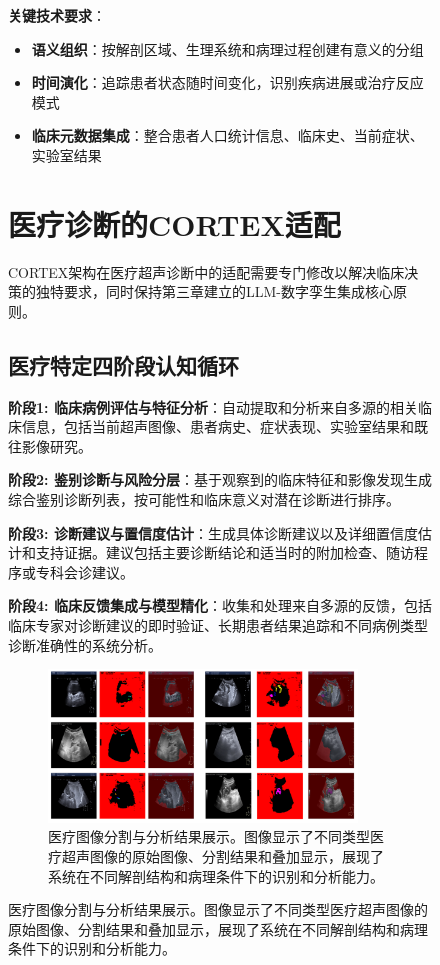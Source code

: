 \begin{figure}[htbp]
\textbf{关键技术要求}：
\begin{itemize}
\item \textbf{语义组织}：按解剖区域、生理系统和病理过程创建有意义的分组
\item \textbf{时间演化}：追踪患者状态随时间变化，识别疾病进展或治疗反应模式
\item \textbf{临床元数据集成}：整合患者人口统计信息、临床史、当前症状、实验室结果
\end{itemize}

\section{医疗诊断的CORTEX适配}

CORTEX架构在医疗超声诊断中的适配需要专门修改以解决临床决策的独特要求，同时保持第三章建立的LLM-数字孪生集成核心原则。

\subsection{医疗特定四阶段认知循环}

\textbf{阶段1: 临床病例评估与特征分析}：自动提取和分析来自多源的相关临床信息，包括当前超声图像、患者病史、症状表现、实验室结果和既往影像研究。

\textbf{阶段2: 鉴别诊断与风险分层}：基于观察到的临床特征和影像发现生成综合鉴别诊断列表，按可能性和临床意义对潜在诊断进行排序。

\textbf{阶段3: 诊断建议与置信度估计}：生成具体诊断建议以及详细置信度估计和支持证据。建议包括主要诊断结论和适当时的附加检查、随访程序或专科会诊建议。

\textbf{阶段4: 临床反馈集成与模型精化}：收集和处理来自多源的反馈，包括临床专家对诊断建议的即时验证、长期患者结果追踪和不同病例类型诊断准确性的系统分析。

\begin{figure}[htbp]
\centering
\includegraphics[width=0.9\textwidth]{figures/Med/medsam_result.png}
\caption{医疗图像分割与分析结果展示。图像显示了不同类型医疗超声图像的原始图像、分割结果和叠加显示，展现了系统在不同解剖结构和病理条件下的识别和分析能力。}
\label{fig:medsam_result}
\end{figure}


\end{figure}
